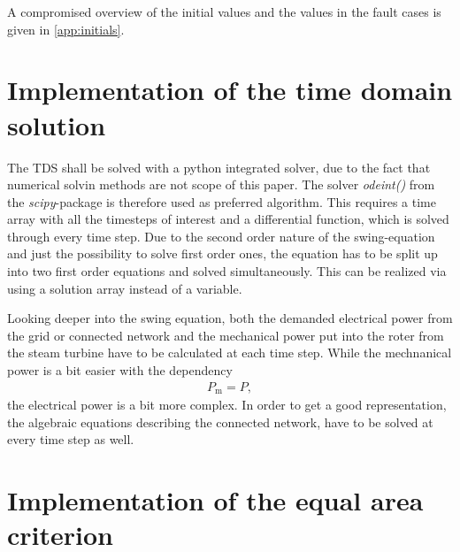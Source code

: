 A compromised overview of the initial values and the values in the fault cases is given in \autoref{app:initials}.

\section{Implementation of the time domain solution}
\label{sec:tds}

The \acs{TDS} shall be solved with a python integrated solver, due to the fact that numerical solvin methods are not scope of this paper. The solver {\itshape odeint()} from the {\itshape scipy}-package is therefore used as preferred algorithm. This requires a time array with all the timesteps of interest and a differential function, which is solved through every time step. Due to the second order nature of the swing-equation and just the possibility to solve first order ones, the equation has to be split up into two first order equations and solved simultaneously. This can be realized via using a solution array instead of a variable. 

Looking deeper into the swing equation, both the demanded electrical power from the grid or connected network and the mechanical power put into the roter from the steam turbine have to be calculated at each time step. While the mechnanical power is a bit easier with the dependency 
\begin{align}
        P_\mathrm{m}=P, \nonumber
\end{align}
the electrical power is a bit more complex. In order to get a good representation, the algebraic equations describing the connected network, have to be solved at every time step as well.


% 

\section{Implementation of the equal area criterion}
\label{sec:eac}

